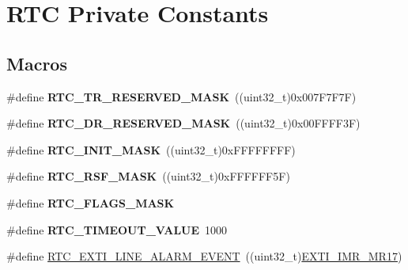 \hypertarget{group___r_t_c___private___constants}{}\section{R\+TC Private Constants}
\label{group___r_t_c___private___constants}
\subsection*{Macros}
\begin{DoxyCompactItemize}
\item 
\#define {\bfseries R\+T\+C\+\_\+\+T\+R\+\_\+\+R\+E\+S\+E\+R\+V\+E\+D\+\_\+\+M\+A\+SK}~((uint32\+\_\+t)0x007\+F7\+F7\+F)\hypertarget{group___r_t_c___private___constants_gacc08d7d212e235f4b04bb88f5567fa54}{}\label{group___r_t_c___private___constants_gacc08d7d212e235f4b04bb88f5567fa54}

\item 
\#define {\bfseries R\+T\+C\+\_\+\+D\+R\+\_\+\+R\+E\+S\+E\+R\+V\+E\+D\+\_\+\+M\+A\+SK}~((uint32\+\_\+t)0x00\+F\+F\+F\+F3\+F)\hypertarget{group___r_t_c___private___constants_ga16855eaae542f992c93170492822d058}{}\label{group___r_t_c___private___constants_ga16855eaae542f992c93170492822d058}

\item 
\#define {\bfseries R\+T\+C\+\_\+\+I\+N\+I\+T\+\_\+\+M\+A\+SK}~((uint32\+\_\+t)0x\+F\+F\+F\+F\+F\+F\+F\+F)\hypertarget{group___r_t_c___private___constants_ga0dbaf639bc171f2055c9055d538f13df}{}\label{group___r_t_c___private___constants_ga0dbaf639bc171f2055c9055d538f13df}

\item 
\#define {\bfseries R\+T\+C\+\_\+\+R\+S\+F\+\_\+\+M\+A\+SK}~((uint32\+\_\+t)0x\+F\+F\+F\+F\+F\+F5\+F)\hypertarget{group___r_t_c___private___constants_ga3a1033490aaf8304e1522d551bd1a7b9}{}\label{group___r_t_c___private___constants_ga3a1033490aaf8304e1522d551bd1a7b9}

\item 
\#define {\bfseries R\+T\+C\+\_\+\+F\+L\+A\+G\+S\+\_\+\+M\+A\+SK}
\item 
\#define {\bfseries R\+T\+C\+\_\+\+T\+I\+M\+E\+O\+U\+T\+\_\+\+V\+A\+L\+UE}~1000\hypertarget{group___r_t_c___private___constants_gaca17c243759056a49a411f6324dd6123}{}\label{group___r_t_c___private___constants_gaca17c243759056a49a411f6324dd6123}

\item 
\#define \hyperlink{group___r_t_c___private___constants_gaeffe9b89372b06df1c0eff2f4346682b}{R\+T\+C\+\_\+\+E\+X\+T\+I\+\_\+\+L\+I\+N\+E\+\_\+\+A\+L\+A\+R\+M\+\_\+\+E\+V\+E\+NT}~((uint32\+\_\+t)\hyperlink{group___peripheral___registers___bits___definition_ga4489fa85d1552b8f40faed93483a5d35}{E\+X\+T\+I\+\_\+\+I\+M\+R\+\_\+\+M\+R17})
\end{DoxyCompactItemize}


